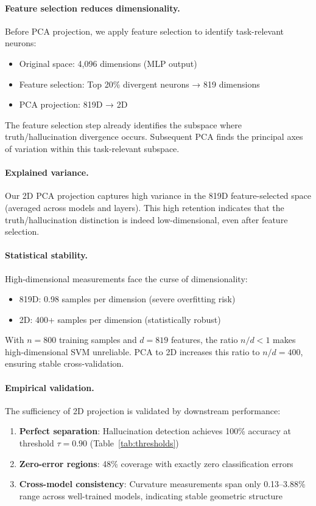 \documentclass[11pt]{article}
\begin{document}
\paragraph{Feature selection reduces dimensionality.}
Before PCA projection, we apply feature selection to identify task-relevant neurons:
\begin{itemize}
    \item Original space: 4,096 dimensions (MLP output)
    \item Feature selection: Top 20\% divergent neurons → 819 dimensions
    \item PCA projection: 819D → 2D
\end{itemize}

The feature selection step already identifies the subspace where truth/hallucination divergence occurs. Subsequent PCA finds the principal axes of variation within this task-relevant subspace.

\paragraph{Explained variance.}
Our 2D PCA projection captures high variance in the 819D feature-selected space (averaged across models and layers). This high retention indicates that the truth/hallucination distinction is indeed low-dimensional, even after feature selection.

\paragraph{Statistical stability.}
High-dimensional measurements face the curse of dimensionality:
\begin{itemize}
    \item 819D: 0.98 samples per dimension (severe overfitting risk)
    \item 2D: 400+ samples per dimension (statistically robust)
\end{itemize}

With $n=800$ training samples and $d=819$ features, the ratio $n/d < 1$ makes high-dimensional SVM unreliable. PCA to 2D increases this ratio to $n/d = 400$, ensuring stable cross-validation.

\paragraph{Empirical validation.}
The sufficiency of 2D projection is validated by downstream performance:
\begin{enumerate}
    \item \textbf{Perfect separation}: Hallucination detection achieves 100\% accuracy at threshold $\tau=0.90$ (Table~\ref{tab:thresholds})
    \item \textbf{Zero-error regions}: 48\% coverage with exactly zero classification errors
    \item \textbf{Cross-model consistency}: Curvature measurements span only 0.13--3.88\% range across well-trained models, indicating stable geometric structure
\end{enumerate}
\end{document}
